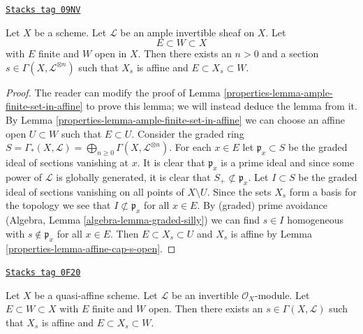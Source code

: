 \begin{lemma}
\label{properties-lemma-ample-finite-set-in-principal-affine}
\href{https://stacks.math.columbia.edu/tag/09NV}{\texttt{Stacks tag 09NV}}

Let $X$ be a scheme. Let $\mathcal{L}$ be an ample invertible sheaf on $X$.
Let
$$
E \subset W \subset X
$$
with $E$ finite and $W$ open in $X$. Then there exists an $n > 0$
and a section $s \in \Gamma(X, \mathcal{L}^{\otimes n})$ such that
$X_s$ is affine and $E \subset X_s \subset W$.
\end{lemma}

\begin{proof}

The reader can modify the proof of Lemma \ref{properties-lemma-ample-finite-set-in-affine}
to prove this lemma; we will instead deduce the lemma from it.
By Lemma \ref{properties-lemma-ample-finite-set-in-affine} we can choose an affine
open $U \subset W$ such that $E \subset U$.
Consider the graded ring $S = \Gamma_*(X, \mathcal{L}) =
\bigoplus_{n \geq 0} \Gamma(X, \mathcal{L}^{\otimes n})$.
For each $x \in E$ let $\mathfrak p_x \subset S$ be the graded ideal
of sections vanishing at $x$. It is clear that $\mathfrak p_x$ is
a prime ideal and since some power of $\mathcal{L}$ is globally
generated, it is clear that $S_{+} \not \subset \mathfrak p_x$.
Let $I \subset S$ be the graded ideal of sections vanishing on all
points of $X \setminus U$. Since the sets $X_s$ form a basis
for the topology we see that $I \not \subset \mathfrak p_x$ for
all $x \in E$.
By (graded) prime avoidance (Algebra, Lemma \ref{algebra-lemma-graded-silly})
we can find $s \in I$ homogeneous
with $s \not \in \mathfrak p_x$ for all $x \in E$.
Then $E \subset X_s \subset U$ and $X_s$ is affine by
Lemma \ref{properties-lemma-affine-cap-s-open}.
\end{proof}

\begin{lemma}
\label{properties-lemma-quasi-affine-invertible-nonvanishing-section}
\href{https://stacks.math.columbia.edu/tag/0F20}{\texttt{Stacks tag 0F20}}

Let $X$ be a quasi-affine scheme. Let $\mathcal{L}$ be an invertible
$\mathcal{O}_X$-module. Let $E \subset W \subset X$ with $E$ finite
and $W$ open. Then there exists an $s \in \Gamma(X, \mathcal{L})$
such that $X_s$ is affine and $E \subset X_s \subset W$.
\end{lemma}

